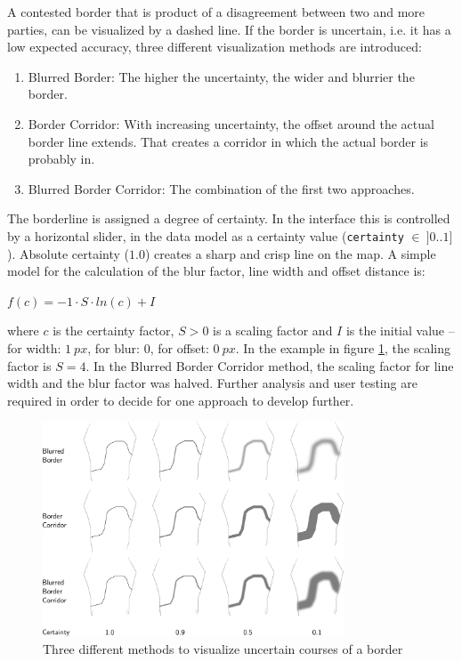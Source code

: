 A contested border that is product of a disagreement between two and more parties, can be visualized by a dashed line. If the border is uncertain, i.e. it has a low expected accuracy, three different visualization methods are introduced:

\begin{enumerate}
  \item Blurred Border: The higher the uncertainty, the wider and blurrier the border.
  \item Border Corridor: With increasing uncertainty, the offset around the actual border line extends. That creates a corridor in which the actual border is probably in.
  \item Blurred Border Corridor: The combination of the first two approaches.
\end{enumerate}

The borderline is assigned a degree of certainty. In the interface this is controlled by a horizontal slider, in the data model as a certainty value (\texttt{certainty} $\in~]0 .. 1]$). Absolute certainty ($1.0$) creates a sharp and crisp line on the map. A simple model for the calculation of the blur factor, line width and offset distance is:

\vspace{-1.5em}
\begin{center}
\begin{math}
    f(c) = -1 \cdot S \cdot ln(c) + I
\end{math}
\end{center}
\vspace{-1em}

where $c$ is the certainty factor, $S>0$ is a scaling factor and $I$ is the initial value -- for width: $1~px$, for blur: $0$, for offset: $0~px$. In the example in figure \ref{fig:uncertainty_border}, the scaling factor is $S=4$. In the Blurred Border Corridor method, the scaling factor for line width and the blur factor was halved. Further analysis and user testing are required in order to decide for one approach to develop further.

\begin{figure}[ht]
  \vspace{1em}
  \centering
  \includegraphics[width=0.8\textwidth]{graphics/extensions/border}
  \caption{Three different methods to visualize uncertain courses of a border}
  \label{fig:uncertainty_border}
\end{figure}

